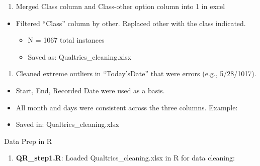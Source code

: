 \documentclass[
]{book}
\providecommand{\tightlist}{%
  \setlength{\itemsep}{0pt}\setlength{\parskip}{0pt}}
\begin{document}
\begin{enumerate}
\def\labelenumi{\arabic{enumi}.}
\setcounter{enumi}{1}
\tightlist
\item
  Merged Class column and Class-other option column into 1 in excel
\end{enumerate}

\begin{itemize}
\tightlist
\item
  Filtered ``Class'' column by other. Replaced other with the class indicated.

  \begin{itemize}
  \tightlist
  \item
    N = 1067 total instances
  \item
    Saved as: Qualtrics\_cleaning.xlsx
  \end{itemize}
\end{itemize}

\begin{enumerate}
\def\labelenumi{\arabic{enumi}.}
\setcounter{enumi}{2}
\tightlist
\item
  Cleaned extreme outliers in ``Today'sDate'' that were errors (e.g., 5/28/1017).
\end{enumerate}

\begin{itemize}
\tightlist
\item
  Start, End, Recorded Date were used as a basis.
\item
  All month and days were consistent across the three columns. Example:
\item
  Saved in: Qualtrics\_cleaning.xlsx
\end{itemize}

Data Prep in R

\begin{enumerate}
\def\labelenumi{\arabic{enumi}.}
\setcounter{enumi}{3}
\tightlist
\item
  \textbf{QR\_step1.R}: Loaded Qualtrics\_cleaning.xlsx in R for data cleaning:
\end{enumerate}
\end{document}
